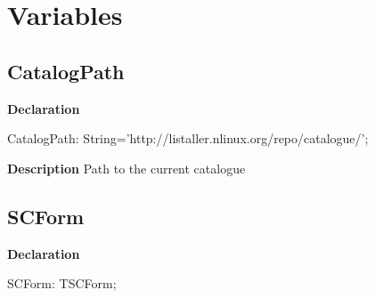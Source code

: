 \documentclass{report}
\newif\ifpdf
\begin{document}
\section{Variables}
\ifpdf
\subsection*{\large{\textbf{CatalogPath}}\normalsize\hspace{1ex}\hrulefill}
\else
\subsection*{CatalogPath}
\fi
\label{swcatalog-CatalogPath}
\begin{list}{}{
\setlength{\itemindent}{0cm}
\setlength{\listparindent}{0cm}
\setlength{\leftmargin}{\evensidemargin}
\addtolength{\leftmargin}{\tmplength}
\settowidth{\labelsep}{X}
\addtolength{\leftmargin}{\labelsep}
\setlength{\labelwidth}{\tmplength}
}
\item[\textbf{Declaration}\hfill]
\ifpdf
\begin{flushleft}
\fi
\begin{ttfamily}
CatalogPath: String='http://listaller.nlinux.org/repo/catalogue/';\end{ttfamily}

\ifpdf
\end{flushleft}
\fi

\par
\item[\textbf{Description}]
Path to the current catalogue

\end{list}
\ifpdf
\subsection*{\large{\textbf{SCForm}}\normalsize\hspace{1ex}\hrulefill}
\else
\subsection*{SCForm}
\fi
\label{swcatalog-SCForm}
\begin{list}{}{
\setlength{\itemindent}{0cm}
\setlength{\listparindent}{0cm}
\setlength{\leftmargin}{\evensidemargin}
\addtolength{\leftmargin}{\tmplength}
\settowidth{\labelsep}{X}
\addtolength{\leftmargin}{\labelsep}
\setlength{\labelwidth}{\tmplength}
}
\item[\textbf{Declaration}\hfill]
\ifpdf
\begin{flushleft}
\fi
\begin{ttfamily}
SCForm: TSCForm;\end{ttfamily}

\ifpdf
\end{flushleft}
\fi

\end{list}
\ifpdf
\end{document}

